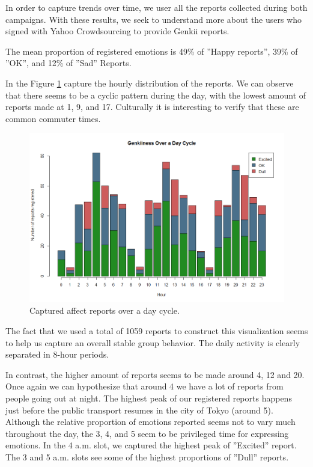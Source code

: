 \documentclass[letterpaper]{article}
\begin{document}
In order to capture trends over time, we user all the reports collected during both campaigns.
With these results, we seek to understand more about the users who signed with Yahoo Crowdsourcing to provide Genkii reports.

The mean proportion of registered emotions is 49\% of ''Happy reports'', 39\% of ''OK'', and 12\% of ''Sad'' Reports.


In the Figure \ref{fig:genkiioverday} capture the hourly distribution of the reports. We can observe that there seems to be a cyclic pattern during the day, with the lowest amount of reports made at 1, 9, and 17. Culturally it is interesting to verify that these are common commuter times. 
\begin{figure}[htb]
	\begin{center}
		\includegraphics[width=1\linewidth]{images/GenkioverDay}
		\caption{Captured affect reports over a day cycle.\label{fig:genkiioverday}}
	\end{center}
\end{figure}

The fact that we used a total of 1059 reports to construct this visualization seems to help us capture an overall stable group behavior. The daily activity is clearly separated in 8-hour periods.

In contrast, the higher amount of reports seems to be made around 4, 12 and 20. Once again we can hypothesize that around 4 we have a lot of reports from people going out at night. The highest peak of our registered reports happens just before the public transport resumes in the city of Tokyo (around 5). Although the relative proportion of emotions reported seems not to vary much throughout the day, the 3, 4, and 5 seem to be privileged time for expressing emotions. In the 4 a.m. slot, we captured the highest peak of ''Excited'' report. The 3 and 5 a.m. slots see some of the highest proportions of ''Dull'' reports.
\end{document}
